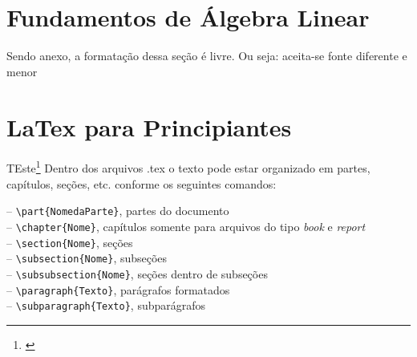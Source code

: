 \begin{anexosenv}

\partanexos



\chapter{Fundamentos de Álgebra Linear}\label{anexo:algebralinear}

Sendo anexo, a formatação dessa seção é livre. Ou seja: aceita-se fonte diferente e menor


\chapter{LaTex para Principiantes}\label{anexo:latex}
TEste\footnote{\cite{Moro2012}}
Dentro dos arquivos .tex o texto pode estar organizado em partes, capítulos, seções, etc. conforme os seguintes comandos:

-- \verb|\part{NomedaParte}|, partes do documento \\
-- \verb|\chapter{Nome}|, capítulos somente para arquivos do tipo \textit{book} e \textit{report}\\
-- \verb|\section{Nome}|, seções\\
-- \verb|\subsection{Nome}|, subseções	\\
-- \verb|\subsubsection{Nome}|, seções dentro de subseções\\
-- \verb|\paragraph{Texto}|, parágrafos formatados	\\
-- \verb|\subparagraph{Texto}|, subparágrafos


\end{anexosenv}
